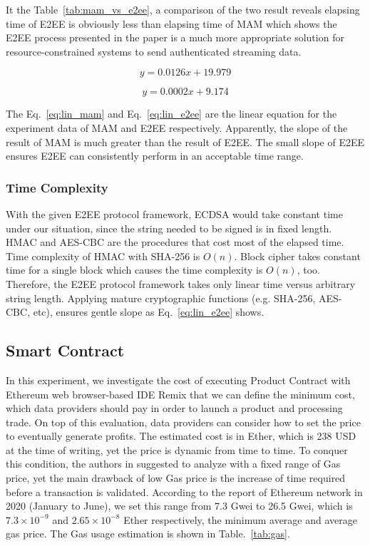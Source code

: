 \documentclass[conference]{IEEEtran}
\begin{document}
It the Table~\ref{tab:mam_vs_e2ee}, a comparison of the two result reveals elapsing time of E2EE is obviously less than elapsing time of MAM which shows the E2EE process presented in the paper is a much more appropriate solution for resource-constrained systems to send authenticated streaming data.

\begin{equation}
    \label{eq:lin_mam}
    y=0.0126 x+19.979  
\end{equation}

\begin{equation}
    \label{eq:lin_e2ee}
    y=0.0002 x+9.174
\end{equation}

The Eq.~\ref{eq:lin_mam} and Eq.~\ref{eq:lin_e2ee} are the linear equation for the experiment data of MAM and E2EE respectively. Apparently, the slope of the result of MAM is much greater than the result of E2EE. The small slope of E2EE ensures E2EE can consistently perform in an acceptable time range.

\subsubsection{Time Complexity}
With the given E2EE protocol framework, ECDSA would take constant time under our situation, since the string needed to be signed is in fixed length. HMAC and AES-CBC are the procedures that cost most of the elapsed time. Time complexity of HMAC with SHA-256 is $O(n)$.\cite{hmac_time_complexity} Block cipher takes constant time for a single block which causes the time complexity is $O(n)$, too. Therefore, the E2EE protocol framework takes only linear time versus arbitrary string length. Applying mature cryptographic functions (e.g. SHA-256, AES-CBC, etc), ensures gentle slope as Eq.~\ref{eq:lin_e2ee} shows.

\subsection{Smart Contract}
In this experiment, we investigate the cost of executing Product Contract with Ethereum web browser-based IDE Remix that we can define the minimum cost, which data providers should pay in order to launch a product and processing trade.  On top of this evaluation, data providers can consider how to set the price to eventually generate profits. The estimated cost is in Ether, which is 238 USD at the time of writing, yet the price is dynamic from time to time. To conquer this condition, the authors in \cite{MindMyValue} suggested to analyze with a fixed range of Gas price,  yet the main drawback of low Gas price is the increase of time required before a transaction is validated. According to the report of Ethereum network\cite{ethereumChart} in 2020 (January to June), we set this range from 7.3 Gwei to 26.5 Gwei, which is $7.3 \times 10^{-9}$ and $2.65 \times 10^{-8}$ Ether respectively, the minimum average and average gas price. The Gas usage estimation is shown in Table.~\ref{tab:gas}.
\end{document}
